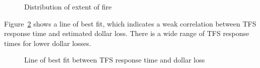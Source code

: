 \documentclass[
  letterpaper,
  DIV=11,
  numbers=noendperiod]{scrartcl}
\begin{document}
\begin{figure}


\caption{\label{fig-bar-extent}Distribution of extent of fire}

\end{figure}%

Figure~\ref{fig-response-vs-money} shows a line of best fit, which
indicates a weak correlation between TFS response time and estimated
dollar loss. There is a wide range of TFS response times for lower
dollar losses.

\begin{figure}


\caption{\label{fig-response-vs-money}Line of best fit between TFS
response time and dollar loss}

\end{figure}%
\end{document}

